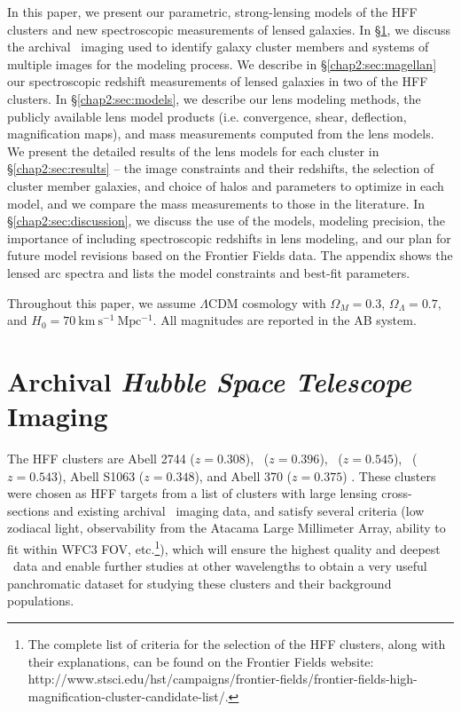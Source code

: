In this paper, we present our parametric, strong-lensing models of the HFF clusters and new spectroscopic measurements of lensed galaxies. In \S \ref{chap2:sec:HSTimaging}, we discuss the archival \hst\ imaging used to identify galaxy cluster members and systems of multiple images for the modeling process. We describe in \S \ref{chap2:sec:magellan} our spectroscopic redshift measurements of lensed galaxies in two of the HFF clusters. In \S \ref{chap2:sec:models}, we describe our lens modeling methods, the publicly available lens model products (i.e. convergence, shear, deflection, magnification maps), and mass measurements computed from the lens models. We present the detailed results of the lens models for each cluster in \S \ref{chap2:sec:results} -- the image constraints and their redshifts, the selection of cluster member galaxies, and choice of halos and parameters to optimize in each model, and we compare the mass measurements to those in the literature. In \S \ref{chap2:sec:discussion}, we discuss the use of the models, modeling precision, the importance of including spectroscopic redshifts in lens modeling, and our plan for future model revisions based on the Frontier Fields data. The appendix shows the lensed arc spectra and lists the model constraints and best-fit parameters.

Throughout this paper, we assume $\Lambda$CDM cosmology with $\Omega_M=0.3$, $\Omega_\Lambda=0.7$, and $H_0=70\ \mathrm{km\ s^{-1}\ Mpc^{-1}}$. All magnitudes are reported in the AB system.

\section{Archival \emph{Hubble Space Telescope} Imaging}
\label{chap2:sec:HSTimaging}

The HFF clusters are Abell 2744 ($z=0.308$), \MACSzerofour\ ($z=0.396$), \MACSzeroseven\ ($z=0.545$), \MACSeleven\ ($z=0.543$), Abell S1063 ($z=0.348$), and Abell 370 ($z=0.375$) \citep{Babyk:2012fj,Mann:2012fr,Ebeling:2007ys,Ebeling:2001rt,Bohringer:2004wd,White:2000nx,Struble:1987cr,Abell:1989ly,Abell:1958mz}. These clusters were chosen as HFF targets from a list of clusters with large lensing cross-sections and existing archival \hst\ imaging data, and satisfy several criteria (low zodiacal light, observability from the Atacama Large Millimeter Array, ability to fit within WFC3 FOV, etc.\footnote{The complete list of criteria for the selection of the HFF clusters, along with their explanations, can be found on the Frontier Fields website: http://www.stsci.edu/hst/campaigns/frontier-fields/frontier-fields-high-magnification-cluster-candidate-list/.}), which will ensure the highest quality and deepest \hst\ data and enable further studies at other wavelengths to obtain a very useful panchromatic dataset for studying these clusters and their background populations.

